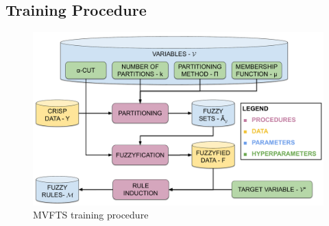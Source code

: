 \subsection{Training Procedure}
\label{sec:mvfts_training_procedure}

\begin{figure}
\centering
\includegraphics[width=\textwidth]{figures/mvfts_training_procedure.pdf}
\caption{MVFTS training procedure} \label{fig:mvfts_training_procedure}
\end{figure}


